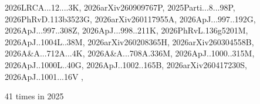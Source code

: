 \documentclass[12pt]{article}
\begin{document}
\begin{description}
{2026LRCA...12....3K,%
2026arXiv260909767P,%
2025Parti...8...98P,%
2026PhRvD.113b3523G,%
2026arXiv260117955A,%
2026ApJ...997..192G,%
2026ApJ...997..308Z,%
2026ApJ...998..211K,%
2026PhRvL.136g5201M,%
2026ApJ..1004L..38M,%
2026arXiv260208365H,%
2026arXiv260304558B,%
2026A&A...712A...4K,%
2026A&A...708A.336M,%
2026ApJ..1000..315M,%
2026ApJ..1000L..40G,%
2026ApJ..1002..165B,%
2026arXiv260417230S,%
2026ApJ..1001...16V%
}, \item %
41 times in 2025 \citep{
2025JApA...46...87S,%
}
\end{description}
\end{document}
